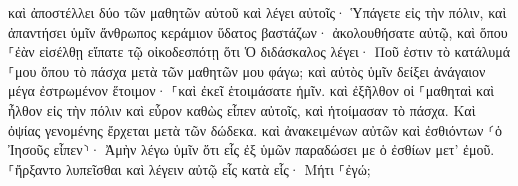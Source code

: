 \documentclass{openreader}
\begin{document}
καὶ ἀποστέλλει δύο τῶν μαθητῶν αὐτοῦ καὶ λέγει αὐτοῖς· Ὑπάγετε εἰς τὴν πόλιν, καὶ ἀπαντήσει ὑμῖν ἄνθρωπος κεράμιον ὕδατος βαστάζων· ἀκολουθήσατε αὐτῷ, 
καὶ ὅπου ⸀ἐὰν εἰσέλθῃ εἴπατε τῷ οἰκοδεσπότῃ ὅτι Ὁ διδάσκαλος λέγει· Ποῦ ἐστιν τὸ κατάλυμά ⸀μου ὅπου τὸ πάσχα μετὰ τῶν μαθητῶν μου φάγω; 
καὶ αὐτὸς ὑμῖν δείξει ἀνάγαιον μέγα ἐστρωμένον ἕτοιμον· ⸀καὶ ἐκεῖ ἑτοιμάσατε ἡμῖν. 
καὶ ἐξῆλθον οἱ ⸀μαθηταὶ καὶ ἦλθον εἰς τὴν πόλιν καὶ εὗρον καθὼς εἶπεν αὐτοῖς, καὶ ἡτοίμασαν τὸ πάσχα. 
Καὶ ὀψίας γενομένης ἔρχεται μετὰ τῶν δώδεκα. 
καὶ ἀνακειμένων αὐτῶν καὶ ἐσθιόντων ⸂ὁ Ἰησοῦς εἶπεν⸃· Ἀμὴν λέγω ὑμῖν ὅτι εἷς ἐξ ὑμῶν παραδώσει με ὁ ἐσθίων μετ’ ἐμοῦ. 
⸀ἤρξαντο λυπεῖσθαι καὶ λέγειν αὐτῷ εἷς κατὰ εἷς· Μήτι ⸀ἐγώ; 
\end{document}

